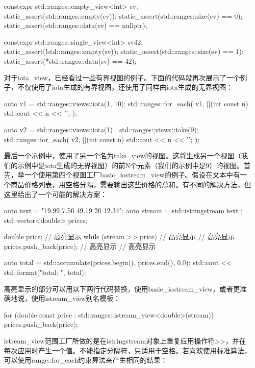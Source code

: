 \begin{cppcode}
constexpr std::ranges::empty_view<int> ev;
static_assert(std::ranges::empty(ev));
static_assert(std::ranges::size(ev) == 0);
static_assert(std::ranges::data(ev) == nullptr);

constexpr std::ranges::single_view<int> sv{42};
static_assert(!std::ranges::empty(sv));
static_assert(std::ranges::size(sv) == 1);
static_assert(*std::ranges::data(sv) == 42);
\end{cppcode}

对于iota_view，已经看过一些有界视图的例子。下面的代码段再次展示了一个例子，不仅使用了iota生成的有界视图，还使用了同样由iota生成的无界视图：

\begin{cppcode}
auto v1 = std::ranges::views::iota(1, 10);
std::ranges::for_each(
	v1,
	[](int const n) {std::cout << n << '\n'; });
	
auto v2 = std::ranges::views::iota(1) |
		  std::ranges::views::take(9);
std::ranges::for_each(
	v2,
	[](int const n) {std::cout << n << '\n'; });
\end{cppcode}

最后一个示例中，使用了另一个名为take_view的视图。这将生成另一个视图（我们的示例中是iota生成的无界视图）的前N个元素（我们的示例中是9）的视图。首先，举一个使用第四个视图工厂basic_iostream_view的例子。假设在文本中有一个商品价格列表，用空格分隔，需要输出这些价格的总和。有不同的解决方法，但这里给出了一个可能的解决方案：

\begin{cppcode}
auto text = "19.99 7.50 49.19 20 12.34";
auto stream = std::istringstream{ text };
std::vector<double> prices;

double price; // 高亮显示
while (stream >> price) // 高亮显示
{ // 高亮显示
	prices.push_back(price); // 高亮显示
} // 高亮显示

auto total = std::accumulate(prices.begin(), prices.end(),
							 0.0);
std::cout << std::format("total: {}\n", total);
\end{cppcode}

高亮显示的部分可以用以下两行代码替换，使用basic_iostream_view，或者更准确地说，使用istream_view别名模板：

\begin{cppcode}
for (double const price :
		std::ranges::istream_view<double>(stream))
{
	prices.push_back(price);
}
\end{cppcode}

istream_view范围工厂所做的是在istringstream对象上重复应用操作符>>，并在每次应用时产生一个值。不能指定分隔符，只适用于空格。若喜欢使用标准算法，可以使用range::for_each约束算法来产生相同的结果：

